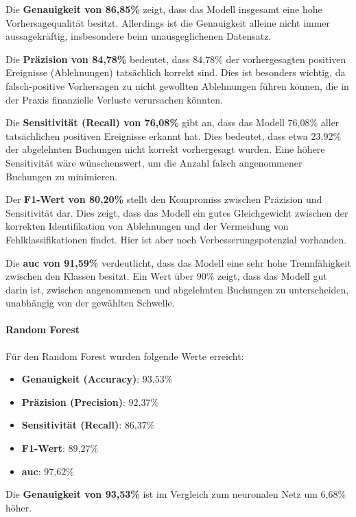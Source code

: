 Die \textbf{Genauigkeit von 86,85\%} zeigt, dass das Modell insgesamt eine hohe Vorhersagequalität besitzt. 
Allerdings ist die Genauigkeit alleine nicht immer aussagekräftig, insbesondere beim unausgeglichenen Datensatz.

Die \textbf{Präzision von 84,78\%} bedeutet, dass $84\text{,}78\%$ der vorhergesagten positiven Ereignisse (Ablehnungen) tatsächlich korrekt sind. Dies ist besonders wichtig, da falsch-positive Vorhersagen zu nicht gewollten Ablehnungen führen können, die in der Praxis finanzielle Verluste verursachen könnten.

Die \textbf{Sensitivität (Recall) von 76,08\%} gibt an, dass das Modell $76\text{,}08\%$ aller tatsächlichen positiven Ereignisse erkannt hat. Dies bedeutet, dass etwa $23\text{,}92\%$ der abgelehnten Buchungen nicht korrekt vorhergesagt wurden. Eine höhere Sensitivität wäre wünschenswert, um die Anzahl falsch angenommener Buchungen zu minimieren.


Der \textbf{F1-Wert von 80,20\%} stellt den Kompromiss zwischen Präzision und Sensitivität dar. Dies zeigt, dass das Modell ein gutes Gleichgewicht zwischen der korrekten Identifikation von Ablehnungen und der Vermeidung von Fehlklassifikationen findet.
Hier ist aber noch Verbesserungspotenzial vorhanden.

Die \textbf{\gls{auc} von 91,59\%} verdeutlicht, dass das Modell eine sehr hohe Trennfähigkeit zwischen den Klassen besitzt. Ein Wert über $90\%$ zeigt, dass das Modell gut darin ist, zwischen angenommenen und abgelehnten Buchungen zu unterscheiden, unabhängig von der gewählten Schwelle.


\paragraph{Random Forest}
Für den Random Forest wurden folgende Werte erreicht:
\begin{itemize}[noitemsep]
    \item \textbf{Genauigkeit (Accuracy)}: $93\text{,}53\%$
    \item \textbf{Präzision (Precision)}: $92\text{,}37\%$
    \item \textbf{Sensitivität (Recall)}: $86\text{,}37\%$
    \item \textbf{F1-Wert}: $89\text{,}27\%$
    \item \textbf{\gls{auc}}: $97\text{,}62\%$
\end{itemize}

Die \textbf{Genauigkeit von 93,53\%} ist im Vergleich zum neuronalen Netz um $6\text{,}68\%$ höher.

